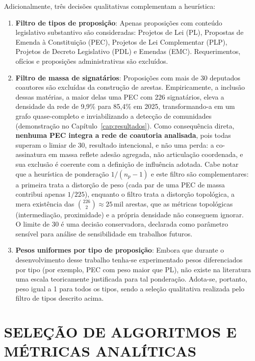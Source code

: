 \documentclass[
      12pt,
      a4paper,
      openright,
      oneside,
      chapter=TITLE,
      section=TITLE,
      english,
      french,
      spanish,
      brazilian
    ]{abntex2}
\begin{document}
    Adicionalmente, três decisões qualitativas complementam a heurística:
    
    \begin{enumerate}[label=\alph*)]
        \item \textbf{Filtro de tipos de proposição}: 
        Apenas proposições com conteúdo legislativo substantivo são consideradas: Projetos de Lei (PL), Propostas de Emenda à Constituição (PEC), Projetos de Lei Complementar (PLP), Projetos de Decreto Legislativo (PDL) e Emendas (EMC). Requerimentos, ofícios e proposições administrativas são excluídos.
        
        \item \textbf{Filtro de massa de signatários}: Proposições com mais de 30 deputados coautores são excluídas da construção de arestas. Empiricamente, a inclusão dessas matérias, a maior delas uma PEC com 226 signatários, eleva a densidade da rede de 9{,}9\% para 85{,}4\% em 2025, transformando-a em um grafo quase-completo e inviabilizando a detecção de comunidades (demonstração no Capítulo~\ref{cap:resultados}). Como consequência direta, \textbf{nenhuma PEC integra a rede de coautoria analisada}, pois todas superam o limiar de 30, resultado intencional, e não uma perda: a co-assinatura em massa reflete adesão agregada, não articulação coordenada, e sua exclusão é coerente com a definição de influência adotada. Cabe notar que a heurística de ponderação $1/(n_p-1)$ e este filtro são complementares: a primeira trata a distorção de peso (cada par de uma PEC de massa contribui apenas $1/225$), enquanto o filtro trata a distorção topológica, a mera existência das $\binom{226}{2} \approx 25\,\text{mil}$ arestas, que as métricas topológicas (intermediação, proximidade) e a própria densidade não conseguem ignorar. O limite de 30 é uma decisão conservadora, declarada como parâmetro sensível para análise de sensibilidade em trabalhos futuros.
    
        \item \textbf{Pesos uniformes por tipo de proposição}: Embora que durante o desenvolvimento desse trabalho tenha-se experimentado pesos diferenciados por tipo (por exemplo, PEC com peso maior que PL), não existe na literatura uma escala teoricamente justificada para tal ponderação. Adota-se, portanto, peso igual a 1 para todos os tipos, sendo a seleção qualitativa realizada pelo filtro de tipos descrito acima.
    \end{enumerate}
    
    \section{SELEÇÃO DE ALGORITMOS E MÉTRICAS ANALÍTICAS}
    
\end{document}

